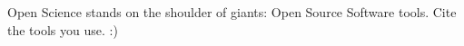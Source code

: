 \begin{acknowledgements}

Open Science stands on the shoulder of giants: Open Source Software tools.
Cite the tools you use. :)

\end{acknowledgements}





\clearpage


